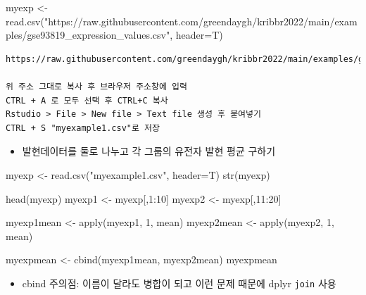 \documentclass[
]{book}
\newenvironment{Shaded}{\begin{snugshade}}{\end{snugshade}}
\newcommand{\AttributeTok}[1]{\textcolor[rgb]{0.77,0.63,0.00}{#1}}
\newcommand{\DecValTok}[1]{\textcolor[rgb]{0.00,0.00,0.81}{#1}}
\newcommand{\FunctionTok}[1]{\textcolor[rgb]{0.00,0.00,0.00}{#1}}
\newcommand{\NormalTok}[1]{#1}
\newcommand{\OtherTok}[1]{\textcolor[rgb]{0.56,0.35,0.01}{#1}}
\newcommand{\SpecialCharTok}[1]{\textcolor[rgb]{0.00,0.00,0.00}{#1}}
\newcommand{\StringTok}[1]{\textcolor[rgb]{0.31,0.60,0.02}{#1}}
\providecommand{\tightlist}{%
  \setlength{\itemsep}{0pt}\setlength{\parskip}{0pt}}
\begin{document}
\begin{Shaded}
\begin{Highlighting}[]

\NormalTok{myexp }\OtherTok{\textless{}{-}} \FunctionTok{read.csv}\NormalTok{(}\StringTok{"https://raw.githubusercontent.com/greendaygh/kribbr2022/main/examples/gse93819\_expression\_values.csv"}\NormalTok{, }\AttributeTok{header=}\NormalTok{T)}
\end{Highlighting}
\end{Shaded}

\begin{verbatim}
https://raw.githubusercontent.com/greendaygh/kribbr2022/main/examples/gse93819_expression_values.csv

위 주소 그대로 복사 후 브라우저 주소창에 입력
CTRL + A 로 모두 선택 후 CTRL+C 복사 
Rstudio > File > New file > Text file 생성 후 붙여넣기
CTRL + S "myexample1.csv"로 저장 
\end{verbatim}

\begin{itemize}
\tightlist
\item
  발현데이터를 둘로 나누고 각 그룹의 유전자 발현 평균 구하기
\end{itemize}

\begin{Shaded}
\begin{Highlighting}[]

\NormalTok{myexp }\OtherTok{\textless{}{-}} \FunctionTok{read.csv}\NormalTok{(}\StringTok{"myexample1.csv"}\NormalTok{, }\AttributeTok{header=}\NormalTok{T)}
\FunctionTok{str}\NormalTok{(myexp)}

\FunctionTok{head}\NormalTok{(myexp)}
\NormalTok{myexp1 }\OtherTok{\textless{}{-}}\NormalTok{ myexp[,}\DecValTok{1}\SpecialCharTok{:}\DecValTok{10}\NormalTok{]}
\NormalTok{myexp2 }\OtherTok{\textless{}{-}}\NormalTok{ myexp[,}\DecValTok{11}\SpecialCharTok{:}\DecValTok{20}\NormalTok{]}

\NormalTok{myexp1mean }\OtherTok{\textless{}{-}} \FunctionTok{apply}\NormalTok{(myexp1, }\DecValTok{1}\NormalTok{, mean)}
\NormalTok{myexp2mean }\OtherTok{\textless{}{-}} \FunctionTok{apply}\NormalTok{(myexp2, }\DecValTok{1}\NormalTok{, mean)}

\NormalTok{myexpmean }\OtherTok{\textless{}{-}} \FunctionTok{cbind}\NormalTok{(myexp1mean, myexp2mean)}
\NormalTok{myexpmean}
\end{Highlighting}
\end{Shaded}

\begin{itemize}
\tightlist
\item
  cbind 주의점: 이름이 달라도 병합이 되고 이런 문제 때문에 dplyr \texttt{join} 사용
\end{itemize}
\end{document}
